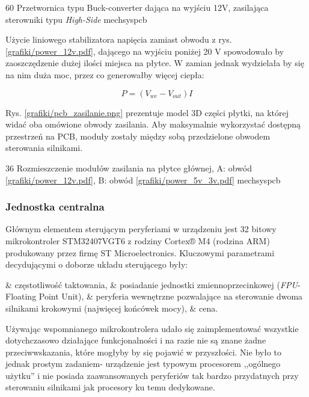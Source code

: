 	{60}
	{Przetwornica typu Buck-converter dająca na wyjściu 12V, zasilająca sterowniki typu {\it High-Side}}
	{mechsyspcb}

Użycie liniowego stabilizatora napięcia zamiast obwodu z rys. \ref{grafiki/power_12v.pdf}, dającego na wyjściu poniżej 20 V spowodowało by zaoszczędzenie dużej ilości miejsca na płytce. W zamian jednak wydzielała by się na nim duża moc, przez co generowałby więcej ciepła:

\begin{equation} \label{eq:zasilanie1}
	P = (V_{we} - V_{out})I
\end{equation}

Rys. \ref{grafiki/pcb_zasilanie.png} prezentuje model 3D części płytki, na której widać oba omówione obwody zasilania. Aby maksymalnie wykorzystać dostępną przestrzeń na PCB, moduły zostały między sobą przedzielone obwodem sterowania silnikami.

	{36}
	{Rozmieszczenie modułów zasilania na płytce głównej, A: obwód \ref{grafiki/power_12v.pdf}, B: obwód \ref{grafiki/power_5v_3v.pdf}}
	{mechsyspcb}
	
\subsubsection{Jednostka centralna}

Głównym elementem sterującym peryferiami w urządzeniu jest 32 bitowy mikrokontroler STM32407VGT6 z rodziny Cortex® M4 (rodzina ARM) produkowany przez firmę ST Microelectronics. Kluczowymi parametrami decydującymi o doborze układu sterującego były:

\begin{easylist}
	& częstotliwość taktowania,
	& posiadanie jednostki zmiennoprzecinkowej ({\it FPU}- Floating Point Unit),
	& peryferia wewnętrzne pozwalające na sterowanie dwoma silnikami krokowymi (najwięcej końcówek mocy),
	& cena.
	\\
\end{easylist} 

Używając wspomnianego mikrokontrolera udało się zaimplementować wszystkie dotychczasowo działające funkcjonalności i na razie nie są znane żadne przeciwwskazania, które mogłyby by się pojawić w przyszłości. Nie było to jednak prostym zadaniem- urządzenie jest typowym procesorem ,,ogólnego użytku'' i nie posiada zaawansowanych peryferiów tak bardzo przydatnych przy sterowaniu silnikami jak procesory ku temu dedykowane. 

